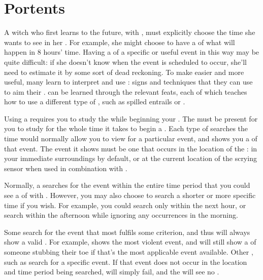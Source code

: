 \section{Portents}

A witch who first learns to {\foretell} the future, with , must explicitly choose the time she wants to see in her {\visions}.
For example, she might choose to have a {\vision} of what will happen in 8 hours' time.
Having a {\vision} of a specific or useful event in this way may be quite difficult: if she doesn't know when the event is scheduled to occur, she'll need to estimate it by some sort of dead reckoning.
To make {\foretelling} easier and more useful, many  learn to interpret and use {\portents}: signs and techniques that they can use to aim their {\foretelling} {\visions}.
\capital{\portents} can be learned through the relevant feats, each of which teaches how to use a different type of {\portent}, such as spilled entrails or .

Using a {\portent} requires you to study the {\portent} while beginning your {\vision}.
The {\portent} must be present for you to study for the whole time it takes to begin a {\vision}.
Each type of {\portent} searches the time  would normally allow you to view for a particular event, and shows you a {\vision} of that event.
The event it shows must be one that occurs in the location of the {\vision}: in your immediate surroundings by default, or at the current location of the scrying sensor when used in combination with .

Normally, a {\portent} searches for the event within the entire time period that you could see a {\vision} of with .
However, you may also choose to search a shorter or more specific time if you wish.
For example, you could search only within the next hour, or search within the afternoon while ignoring any occurrences in the morning.

Some {\portents} search for the event that most fulfils some criterion, and thus will always show a valid {\vision}.
For example,  shows the most violent event, and will still show a {\vision} of someone stubbing their toe if that's the most applicable event available.
Other {\portents}, such as  search for a specific event.
If that event does not occur in the location and time period being searched,  will simply fail, and the  will see no {\vision}.

